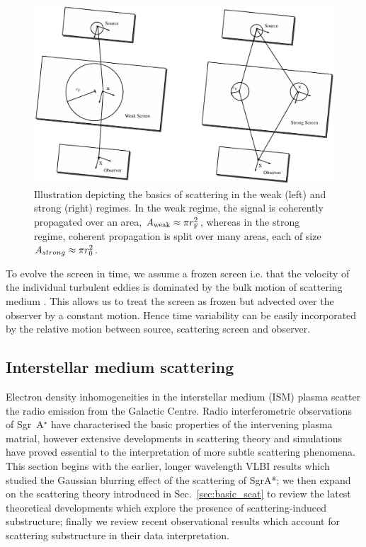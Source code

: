 \begin{figure}
\begin{center}
\includegraphics[width=1.\columnwidth]{Images/scatter.pdf}
\caption{Illustration depicting the basics of scattering in the weak (left) and strong (right) regimes. In the weak regime, the signal is coherently propagated over an area, $A_{\rm weak} \approx \pi r_{\rm F}^2$, whereas in the strong regime, coherent propagation is split over many areas, each of size $A_{strong} \approx \pi r_{\rm 0}^2$. \label{fig:scatter}
}
\end{center}
\end{figure}

To evolve the screen in time, we assume a frozen screen i.e. that the velocity of the individual turbulent eddies is dominated by the bulk motion of scattering medium \citep[e.g.][]{Lay_1997}. This allows us to treat the screen as frozen but advected over the observer by a constant motion. Hence time variability can be easily incorporated by the relative motion between source, scattering screen and observer.

\subsection{Interstellar medium scattering}\label{sec:ism_scat}

Electron density inhomogeneities in the interstellar medium (ISM) plasma scatter the radio emission from the Galactic Centre. Radio interferometric observations of Sgr~A$^\star$ have characterised the basic properties of the intervening plasma matrial, however extensive developments in scattering theory and simulations have proved essential to the interpretation of more subtle scattering phenomena. This section begins with the earlier, longer wavelength VLBI results which studied the Gaussian blurring effect of the scattering of SgrA*; we then expand on the scattering theory introduced in Sec.~\ref{sec:basic_scat} to review the latest theoretical developments which explore the presence of scattering-induced substructure; finally we review recent observational results which account for scattering substructure in their data interpretation. 


